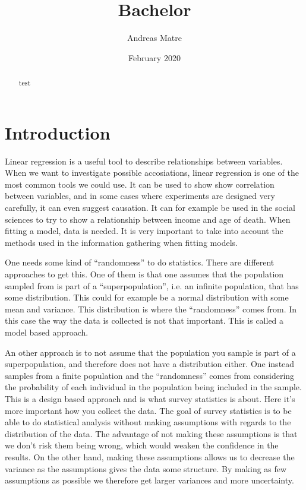 \documentclass{article}
\title{Bachelor}
\author{Andreas Matre}
\date{February 2020}
\begin{document}
\newtheorem{definition}{Definition}[section]
\newtheorem{theorem}{Theorem}
\newtheorem{example}{Example}[section]


\maketitle

\begin{abstract}
 test 
\end{abstract}

\tableofcontents

\section{Introduction}

Linear regression is a useful tool to describe relationships between variables.
When we want to investigate possible accosiations, linear regression
is one of the most common tools we could use. It can be used to show show correlation between
variables, and in some cases where experiments are designed very carefully, it can even suggest causation.
It can for example be used in the social sciences to try to show a relationship
between income and age of death.
When fitting a model, data is needed. It is very important to take into account the methods used in
the information gathering when fitting models.

One needs some kind of ``randomness'' to do statistics. There are different
approaches to get this.
One of them is that one assumes that the population sampled from is part of a ``superpopulation'', i.e. an
infinite population, that has some distribution. This could for example be a
normal distribution with some mean and variance.  This distribution is where the
``randomness'' comes from. In this case the way the data
is collected is not that important. This is called a model based approach.

An other approach is to not assume that the population you sample is part of a
superpopulation, and therefore does not have a distribution either.
One instead samples from a finite population and the ``randomness'' comes from
considering the probability of each individual in the population being included
in the sample. This is a design based approach and is what survey statistics is about. Here it's more important how
you collect the data.
The goal of survey statistics is to be able to do statistical analysis without
making assumptions with regards to the distribution of the data. The advantage
of not making these assumptions is that we don't risk them being wrong, which
would weaken the confidence in the results. On the other hand,
making these assumptions allows us to decrease the variance as the assumptions
gives the data some structure. By making as few assumptions as possible we
therefore get larger variances and more uncertainty.
\end{document}
